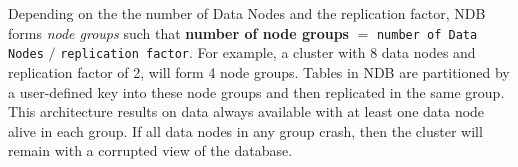 Depending on the the number of Data Nodes and the replication factor,
NDB forms \emph{node groups} such that \textbf{number of node groups}
$=$ \texttt{number of Data Nodes} $/$ \texttt{replication factor}. For example, a
cluster with 8 data nodes and replication factor of 2, will form 4
node groups. Tables in NDB are partitioned by a user-defined key into
these node groups and then replicated in the same group. This
architecture results on data always available with at least one data
node alive in each group. If all data nodes in any group crash, then
the cluster will remain with a corrupted view of the database.

